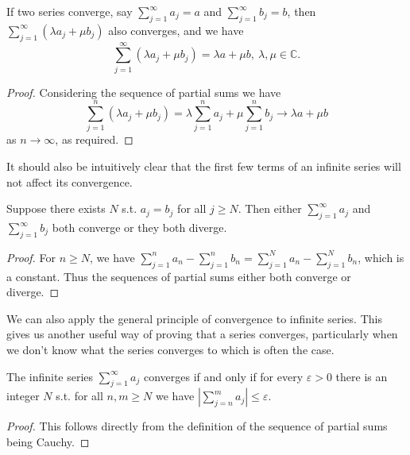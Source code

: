 \begin{proposition}
	If two series converge, say $\sum_{j = 1}^{\infty} a_j = a$ and $\sum_{j = 1}^{\infty} b_j = b$, then $\sum_{j = 1}^{\infty} (\lambda a_j + \mu b_j)$ also converges, and we have
	$$
	\sum_{j = 1}^{\infty} (\lambda a_j + \mu b_j) = \lambda a + \mu b,\ \lambda, \mu \in \mathbb{C}.
	$$
\end{proposition}
\begin{proof}
	Considering the sequence of partial sums we have
	$$
	\sum_{j = 1}^n (\lambda a_j + \mu b_j) = \lambda \sum_{j=1}^n a_j + \mu \sum_{j = 1}^n b_j \longrightarrow \lambda a + \mu b
	$$
	as $n \rightarrow \infty$, as required.
\end{proof}

It should also be intuitively clear that the first few terms of an infinite series will not affect its convergence.

\begin{proposition}
Suppose there exists $N$ s.t. $a_j = b_j$ for all $j \geq N$. Then either $\sum_{j = 1}^{\infty} a_j$ and $\sum_{j = 1}^{\infty} b_j$ both converge or they both diverge.
\end{proposition}
\begin{proof}
	For $n \geq N$, we have $\sum_{j = 1}^n a_n - \sum_{j = 1}^n b_n =  \sum_{j = 1}^N a_n - \sum_{j = 1}^N b_n$, which is a constant. Thus the sequences of partial sums either both converge or diverge.
\end{proof}

We can also apply the general principle of convergence to infinite series. This gives us another useful way of proving that a series converges, particularly when we don't know what the series converges to which is often the case.

\begin{theorem}
	The infinite series $\sum_{j = 1}^{\infty} a_j$ converges if and only if for every $\varepsilon > 0$ there is an integer $N$ s.t. for all $n, m \geq N$ we have $|\sum_{j = n}^m a_j| \leq \varepsilon$.
\end{theorem}
\begin{proof}
	This follows directly from the definition of the sequence of partial sums being Cauchy.
\end{proof}



